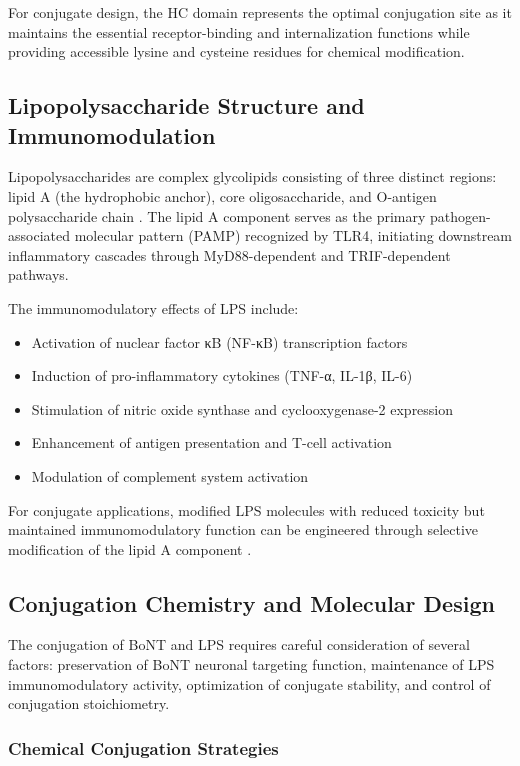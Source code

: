 \documentclass[11pt,a4paper]{article}
\begin{document}
For conjugate design, the HC domain represents the optimal conjugation site as it maintains the essential receptor-binding and internalization functions while providing accessible lysine and cysteine residues for chemical modification.

\subsection{Lipopolysaccharide Structure and Immunomodulation}

Lipopolysaccharides are complex glycolipids consisting of three distinct regions: lipid A (the hydrophobic anchor), core oligosaccharide, and O-antigen polysaccharide chain \cite{Whitfield2014}. The lipid A component serves as the primary pathogen-associated molecular pattern (PAMP) recognized by TLR4, initiating downstream inflammatory cascades through MyD88-dependent and TRIF-dependent pathways.

The immunomodulatory effects of LPS include:
\begin{itemize}
\item Activation of nuclear factor κB (NF-κB) transcription factors
\item Induction of pro-inflammatory cytokines (TNF-α, IL-1β, IL-6)
\item Stimulation of nitric oxide synthase and cyclooxygenase-2 expression
\item Enhancement of antigen presentation and T-cell activation
\item Modulation of complement system activation
\end{itemize}

For conjugate applications, modified LPS molecules with reduced toxicity but maintained immunomodulatory function can be engineered through selective modification of the lipid A component \cite{Mata-Haro2007}.

\subsection{Conjugation Chemistry and Molecular Design}

The conjugation of BoNT and LPS requires careful consideration of several factors: preservation of BoNT neuronal targeting function, maintenance of LPS immunomodulatory activity, optimization of conjugate stability, and control of conjugation stoichiometry.

\subsubsection{Chemical Conjugation Strategies}
\end{document}
